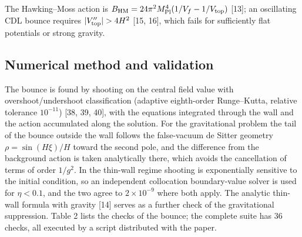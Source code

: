 \documentclass[11pt,a4paper]{article}
\begin{document}
The Hawking--Moss action is $B_{\rm HM} = 24\pi^2 M_{\rm Pl}^4(1/V_f - 1/V_{\rm top})$ [13]; an oscillating CDL bounce requires $|V''_{\rm top}| > 4H^2$ [15, 16], which fails for sufficiently flat potentials or strong gravity.

\subsection{Numerical method and validation}
The bounce is found by shooting on the central field value with overshoot/undershoot classification (adaptive eighth-order Runge--Kutta, relative tolerance $10^{-11}$) [38, 39, 40], with the equations integrated through the wall and the action accumulated along the solution. For the gravitational problem the tail of the bounce outside the wall follows the false-vacuum de Sitter geometry $\rho = \sin(H\xi)/H$ toward the second pole, and the difference from the background action is taken analytically there, which avoids the cancellation of terms of order $1/g^2$. In the thin-wall regime shooting is exponentially sensitive to the initial condition, so an independent collocation boundary-value solver is used for $\eta < 0.1$, and the two agree to $2\times10^{-9}$ where both apply. The analytic thin-wall formula with gravity [14] serves as a further check of the gravitational suppression. Table 2 lists the checks of the bounce; the complete suite has 36 checks, all executed by a script distributed with the paper.
\end{document}
